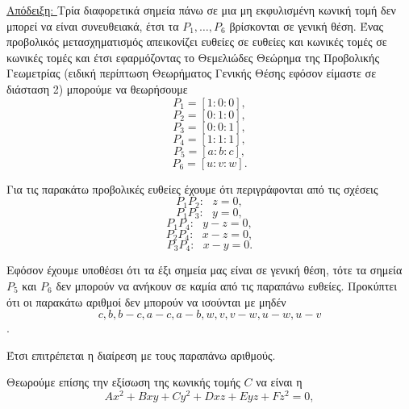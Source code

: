 \documentclass[12pt, a4paper]{book}
\begin{document}
\underline{Απόδειξη: }  Τρία διαφορετικά σημεία πάνω σε μια μη εκφυλισμένη κωνική τομή δεν μπορεί να είναι συνευθειακά, έτσι τα $P_1,…,P_6$ βρίσκονται σε γενική θέση. Ένας προβολικός μετασχηματισμός απεικονίζει ευθείες σε ευθείες και κωνικές τομές σε κωνικές τομές και έτσι εφαρμόζοντας το Θεμελιώδες Θεώρημα της Προβολικής Γεωμετρίας (ειδική περίπτωση Θεωρήματος Γενικής Θέσης εφόσον είμαστε σε διάσταση 2) μπορούμε να θεωρήσουμε
\begin{displaymath}
P_1=[1:0:0],
\end{displaymath}
\begin{displaymath}
P_2=[0:1:0],
\end{displaymath}
\begin{displaymath}
P_3=[0:0:1],
\end{displaymath}
\begin{displaymath}
P_4=[1:1:1],
\end{displaymath}
\begin{displaymath}
P_5=[a:b:c],
\end{displaymath}
\begin{displaymath}
P_6=[u:v:w].
\end{displaymath}

Για τις παρακάτω προβολικές ευθείες έχουμε ότι περιγράφονται από τις σχέσεις
\begin{displaymath}
P_1P_2:\text{ } z=0,
\end{displaymath}
\begin{displaymath}
P_1P_3:\text{ } y=0,
\end{displaymath}
\begin{displaymath}
P_1P_4:\text{ } y-z=0,
\end{displaymath}
\begin{displaymath}
P_2P_4:\text{ } x-z=0,
\end{displaymath}
\begin{displaymath}
P_3P_4:\text{ } x-y=0.
\end{displaymath}

Εφόσον έχουμε υποθέσει ότι τα έξι σημεία μας είναι σε γενική θέση, τότε τα σημεία $P_5$ και $P_6$ δεν μπορούν να ανήκουν σε καμία από τις παραπάνω ευθείες. Προκύπτει ότι οι παρακάτω αριθμοί δεν μπορούν να ισούνται με μηδέν
\begin{displaymath}
c, b, b-c, a-c, a-b, w, v, v-w, u-w, u-v
\end{displaymath}.

Έτσι επιτρέπεται η διαίρεση με τους παραπάνω αριθμούς.

Θεωρούμε επίσης την εξίσωση της κωνικής τομής $C$ να είναι η
\begin{displaymath}
Ax^2+Bxy+Cy^2+Dxz+Eyz+Fz^2=0,
\end{displaymath}
\end{document}
